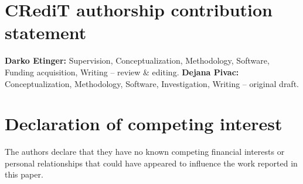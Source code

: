 \documentclass[a4paper]{article}
\begin{document}
%
%
%     
%

\section*{CRediT authorship contribution statement}

\textbf{Darko Etinger:} Supervision, Conceptualization, Methodology,
Software, Funding acquisition, Writing -- review \& editing.
\textbf{Dejana Pivac:} Conceptualization, Methodology, Software,
Investigation, Writing -- original draft.

\section*{Declaration of competing interest}

The authors declare that they have no known competing financial interests or
personal relationships that could have appeared to influence the work reported
in this paper.
\end{document}
